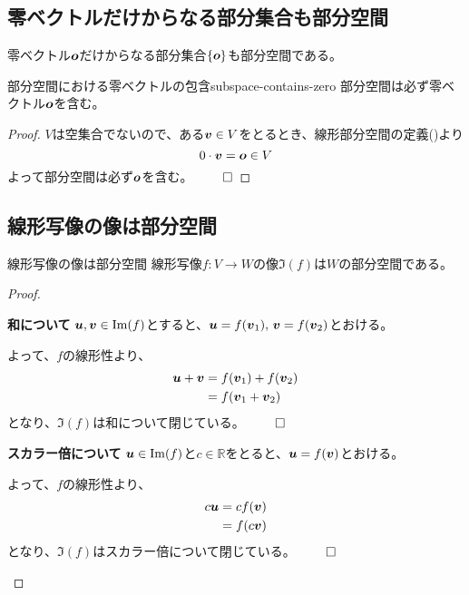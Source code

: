 \documentclass[../../../topic_linear-algebra]{subfiles}
\begin{document}
\subsection{零ベクトルだけからなる部分集合も部分空間}

零ベクトル$\vb*{o}$だけからなる部分集合$\{ \vb*{o} \}$も部分空間である。

\begin{theorem}{部分空間における零ベクトルの包含}{subspace-contains-zero}
  部分空間は必ず零ベクトル$\vb*{o}$を含む。
\end{theorem}

\begin{proof}
  $V$は空集合でないので、ある$\vb*{v} \in V$をとるとき、線形部分空間の定義()より
  \begin{equation*}
    0 \cdot \vb*{v} = \vb*{o} \in V
  \end{equation*}
  よって部分空間は必ず$\vb*{o}$を含む。 $\qed$
\end{proof}

\subsection{線形写像の像は部分空間}

\begin{theorem*}{線形写像の像は部分空間}
  線形写像$f\colon V \to W$の像$\Im(f)$は$W$の部分空間である。
\end{theorem*}

\begin{proof}
  \begin{subpattern}{\bfseries 和について}
    $\vb*{u}, \vb*{v} \in \Im(f)$とすると、$\vb*{u} = f(\vb*{v}_1),\, \vb*{v} = f(\vb*{v}_2)$とおける。

    よって、$f$の線形性より、
    \begin{align*}
      \vb*{u} + \vb*{v} & = f(\vb*{v}_1) + f(\vb*{v}_2) \\
                        & = f(\vb*{v}_1 + \vb*{v}_2)
    \end{align*}
    となり、$\Im(f)$は和について閉じている。 $\qed$
  \end{subpattern}

  \begin{subpattern}{\bfseries スカラー倍について}
    $\vb*{u} \in \Im(f)$と$c \in \mathbb{R}$をとると、$\vb*{u} = f(\vb*{v})$とおける。

    よって、$f$の線形性より、
    \begin{align*}
      c \vb*{u} & = c f(\vb*{v}) \\
                & = f(c \vb*{v})
    \end{align*}
    となり、$\Im(f)$はスカラー倍について閉じている。 $\qed$
  \end{subpattern}
\end{proof}
\end{document}
